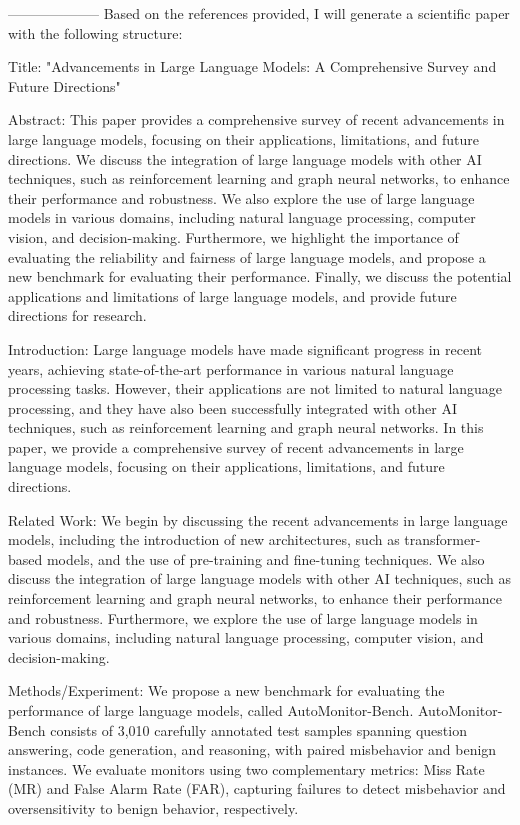         --------------------
         Based on the references provided, I will generate a scientific paper with the following structure:

Title: "Advancements in Large Language Models: A Comprehensive Survey and Future Directions"

Abstract:
This paper provides a comprehensive survey of recent advancements in large language models, focusing on their applications, limitations, and future directions. We discuss the integration of large language models with other AI techniques, such as reinforcement learning and graph neural networks, to enhance their performance and robustness. We also explore the use of large language models in various domains, including natural language processing, computer vision, and decision-making. Furthermore, we highlight the importance of evaluating the reliability and fairness of large language models, and propose a new benchmark for evaluating their performance. Finally, we discuss the potential applications and limitations of large language models, and provide future directions for research.

Introduction:
Large language models have made significant progress in recent years, achieving state-of-the-art performance in various natural language processing tasks. However, their applications are not limited to natural language processing, and they have also been successfully integrated with other AI techniques, such as reinforcement learning and graph neural networks. In this paper, we provide a comprehensive survey of recent advancements in large language models, focusing on their applications, limitations, and future directions.

Related Work:
We begin by discussing the recent advancements in large language models, including the introduction of new architectures, such as transformer-based models, and the use of pre-training and fine-tuning techniques. We also discuss the integration of large language models with other AI techniques, such as reinforcement learning and graph neural networks, to enhance their performance and robustness. Furthermore, we explore the use of large language models in various domains, including natural language processing, computer vision, and decision-making.

Methods/Experiment:
We propose a new benchmark for evaluating the performance of large language models, called AutoMonitor-Bench. AutoMonitor-Bench consists of 3,010 carefully annotated test samples spanning question answering, code generation, and reasoning, with paired misbehavior and benign instances. We evaluate monitors using two complementary metrics: Miss Rate (MR) and False Alarm Rate (FAR), capturing failures to detect misbehavior and oversensitivity to benign behavior, respectively.

